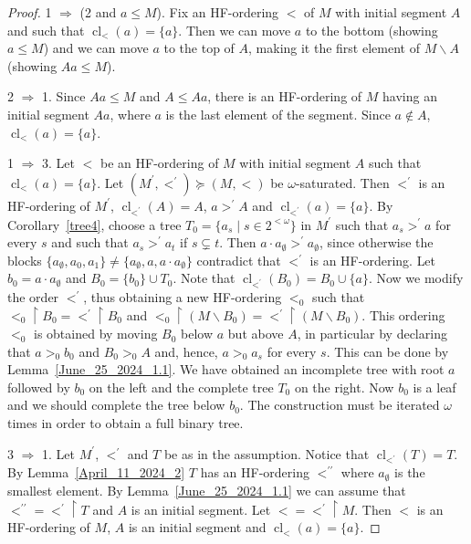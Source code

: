 \documentclass[10pt,a4paper]{article}
\DeclareMathOperator{\cl}{cl}
\theoremstyle{note}
\begin{document}
\begin{proof} 1 $\Rightarrow$ (2 and $a\leq M$). Fix an HF-ordering $<$ of $M$ with initial segment $A$ and such that $\cl_<(a)=\{a\}$.  Then  we can move $a$ to the bottom (showing $a\leq M$) and we can move $a$ to the top of $A$, making it the first element of $M\smallsetminus A$ (showing $Aa\leq M$).
	
	2 $\Rightarrow$ 1. Since $Aa\leq M$ and $A\leq Aa$, there is an HF-ordering of $M$ having an initial segment $Aa$, where $a$ is the last element of the segment. Since $a\not\in A$,  $\cl_<(a)=\{a\}$.
	
	1 $\Rightarrow$ 3. Let $<$ be an HF-ordering of $M$ with initial segment $A$ such that $\cl_<(a)=\{a\}$.  Let $(M^\prime,<^\prime)\succeq (M,<)$ be $\omega$-saturated. Then $<^\prime$ is an HF-ordering of $M^\prime$, $\cl_{<^\prime}(A)=A$,  $a>^\prime A$ and  $\cl_{<^\prime}(a)=\{a\}$.   By Corollary~\ref{tree4}, choose a tree $T_0=\{a_s\mid s\in 2^{<\omega}\}$ in  $M^\prime$ such that $a_s>^\prime a$  for every $s$ and such that
	$a_s>^\prime a_t$  if  $s\subsetneq t$. Then $a\cdot a_\emptyset>^\prime a_\emptyset$, since otherwise the blocks $\{a_\emptyset,a_0,a_1\}\neq \{a_\emptyset, a, a\cdot a_\emptyset\}$ contradict that $<^\prime$ is an HF-ordering. Let $b_0=a\cdot a_\emptyset$ and $B_0= \{b_0\}\cup T_0$.  Note that $\cl_{<^\prime}(B_0)=B_0\cup\{a\}$. Now we modify the order $<^\prime$, thus obtaining a new HF-ordering $<_0$ such that $<_0\restriction B_0= <^\prime \restriction B_0$ and $ <_0\restriction (M\smallsetminus B_0)= <^\prime\restriction (M\smallsetminus B_0)$. This ordering $<_0$ is obtained by moving  $B_0$  below $a$ but above $A$, in particular by declaring that $a>_0 b_0$ and $B_0>_0 A$ and, hence,  $a>_0a_s$ for every $s$. This can be done by Lemma~\ref{June_25_2024_1.1}. We have obtained an incomplete tree with root $a$ followed by $b_0$ on the left and the complete tree $T_0$ on the right. Now $b_0$ is a leaf and we should complete the tree below $b_0$. The construction must be iterated $\omega$ times in order to obtain a full binary tree.
	
	3 $\Rightarrow$ 1. Let $M^\prime$, $<^\prime$ and $T$ be as in the assumption. Notice that $\cl_{<^\prime}(T)=T$. By Lemma~\ref{April_11_2024_2} $T$ has an HF-ordering $<^{\prime\prime}$ where $a_\emptyset$ is the smallest element. By Lemma~\ref{June_25_2024_1.1} we can assume that $<^{\prime\prime} = <^\prime \restriction T$ and $A$ is an initial segment. Let $<=<^\prime\restriction M$. Then $<$ is an HF-ordering of $M$, $A$ is an initial segment and $\cl_<(a)=\{a\}$.
\end{proof}
\end{document}
